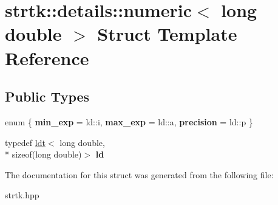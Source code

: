 \hypertarget{structstrtk_1_1details_1_1numeric_3_01long_01double_01_4}{\section{strtk\-:\-:details\-:\-:numeric$<$ long double $>$ Struct Template Reference}
\label{structstrtk_1_1details_1_1numeric_3_01long_01double_01_4}
}
\subsection*{Public Types}
\begin{DoxyCompactItemize}
\item 
enum \{ {\bfseries min\-\_\-exp} = ld\-:\-:i, 
{\bfseries max\-\_\-exp} = ld\-:\-:a, 
{\bfseries precision} = ld\-:\-:p
 \}
\item 
\hypertarget{structstrtk_1_1details_1_1numeric_3_01long_01double_01_4_a6ada7ea6d37ad505b67b7d8e2cef0391}{typedef \hyperlink{structstrtk_1_1details_1_1ldt}{ldt}$<$ long double, \\*
sizeof(long double)$>$ {\bfseries ld}}\label{structstrtk_1_1details_1_1numeric_3_01long_01double_01_4_a6ada7ea6d37ad505b67b7d8e2cef0391}

\end{DoxyCompactItemize}


The documentation for this struct was generated from the following file\-:\begin{DoxyCompactItemize}
\item 
strtk.\-hpp\end{DoxyCompactItemize}
